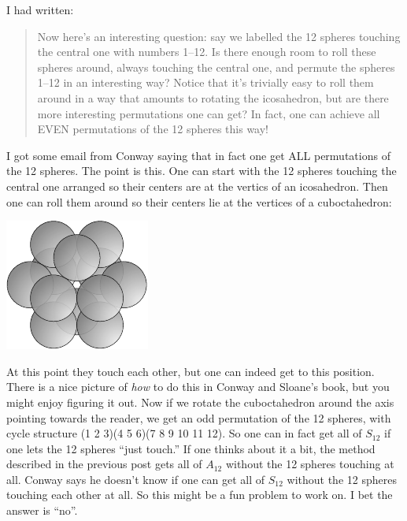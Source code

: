 I had written:
\begin{quote}
Now here's an interesting question: say we labelled the 12 spheres touching the central one with numbers 1--12. Is there enough room to roll these spheres around, always touching the central one, and permute the spheres 1--12 in an interesting way? Notice that it's trivially easy to roll them around in a way that amounts to rotating the icosahedron, but are there more interesting permutations one can get?
In fact, one can achieve all EVEN permutations of the 12 spheres this way!
\end{quote}
I got some email from Conway saying that in fact one get ALL permutations of the 12 spheres. The point is this. One can start with the 12 spheres touching the central one arranged so their centers are at the vertics of an icosahedron. Then one can roll them around so their centers lie at the vertices of a cuboctahedron:
\begin{center}
\includegraphics[]{figures/wk20_fig5.pdf}
\end{center}
%
% 
%
%
At this point they touch each other, but one can indeed get to this position. There is a nice picture of \emph{how} to do this in Conway and Sloane's book, but you might enjoy figuring it out.
Now if we rotate the cuboctahedron around the axis pointing towards the reader, we get an odd permutation of the 12 spheres, with cycle structure (1 2 3)(4 5 6)(7 8 9 10 11 12). So one can in fact get all of $S_{12}$ if one lets the 12 spheres ``just touch.'' If one thinks about it a bit, the method described in the previous post gets all of $A_{12}$ without the 12 spheres touching at all. Conway says he doesn't know if one can get all of $S_{12}$ without the 12 spheres touching each other at all. So this might be a fun problem to work on. I bet the answer is ``no''.


